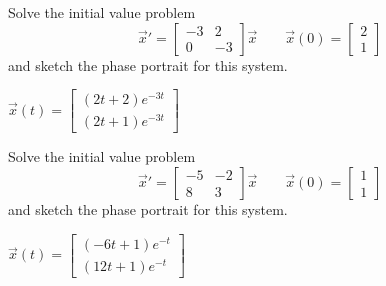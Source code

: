 \begin{exercise}
Solve the initial value problem
\[ {\vec{x}}' = \begin{bmatrix} -3 & 2 \\ 0 & -3 \end{bmatrix} \vec{x} \qquad \vec{x}(0) = \begin{bmatrix} 2 \\ 1 \end{bmatrix} \] and sketch the phase portrait for this system.
\end{exercise}
\comboSol{%
}
{%
$\vec{x}(t) = \left[\begin{smallmatrix} (2t+2)e^{-3t} \\ (2t+1)e^{-3t} \end{smallmatrix}\right]$ \hfill{}\hfill\hfill
}


\begin{exercise}
Solve the initial value problem
\[ {\vec{x}}' = \begin{bmatrix} -5 & -2 \\ 8 & 3 \end{bmatrix} \vec{x} \qquad \vec{x}(0) = \begin{bmatrix} 1 \\ 1 \end{bmatrix} \] and sketch the phase portrait for this system.
\end{exercise}
\comboSol{%
}
{%
$\vec{x}(t) = \left[\begin{smallmatrix} (-6t+1)e^{-t} \\ (12t+1)e^{-t} \end{smallmatrix}\right]$ \hfill{}\hfill\hfill
}

